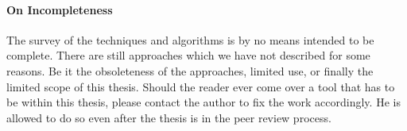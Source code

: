 \paragraph{On Incompleteness} The survey of the techniques and algorithms is
by no means intended to be complete. There are still approaches which we have
not described for some reasons. Be it the obsoleteness of the approaches,
limited use, or finally the limited scope of this thesis. Should the reader
ever come over a tool that has to be within this thesis, please contact the
author to fix the work accordingly. He is allowed to do so even after the
thesis is in the peer review process.
